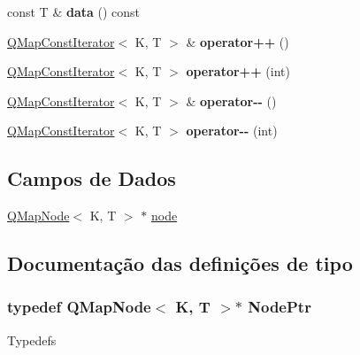 \begin{DoxyCompactItemize}
\item 
\hypertarget{class_q_map_const_iterator_ad6b649d981086e75f241ff939f275e14}{const T \& {\bfseries data} () const }\label{class_q_map_const_iterator_ad6b649d981086e75f241ff939f275e14}

\item 
\hypertarget{class_q_map_const_iterator_a0afe02281082a9eb4057b65d4f2b102f}{\hyperlink{class_q_map_const_iterator}{Q\-Map\-Const\-Iterator}$<$ K, T $>$ \& {\bfseries operator++} ()}\label{class_q_map_const_iterator_a0afe02281082a9eb4057b65d4f2b102f}

\item 
\hypertarget{class_q_map_const_iterator_a8886dab4e16318247a0074c3c15d358c}{\hyperlink{class_q_map_const_iterator}{Q\-Map\-Const\-Iterator}$<$ K, T $>$ {\bfseries operator++} (int)}\label{class_q_map_const_iterator_a8886dab4e16318247a0074c3c15d358c}

\item 
\hypertarget{class_q_map_const_iterator_a330c9aca9657c7035411e13bfe7548cf}{\hyperlink{class_q_map_const_iterator}{Q\-Map\-Const\-Iterator}$<$ K, T $>$ \& {\bfseries operator-\/-\/} ()}\label{class_q_map_const_iterator_a330c9aca9657c7035411e13bfe7548cf}

\item 
\hypertarget{class_q_map_const_iterator_a2f3a7332801402c4e27725f48067ad6c}{\hyperlink{class_q_map_const_iterator}{Q\-Map\-Const\-Iterator}$<$ K, T $>$ {\bfseries operator-\/-\/} (int)}\label{class_q_map_const_iterator_a2f3a7332801402c4e27725f48067ad6c}

\end{DoxyCompactItemize}
\subsection*{Campos de Dados}
\begin{DoxyCompactItemize}
\item 
\hyperlink{struct_q_map_node}{Q\-Map\-Node}$<$ K, T $>$ $\ast$ \hyperlink{class_q_map_const_iterator_a0d092ec36e1f2df9021f48435414fe69}{node}
\end{DoxyCompactItemize}


\subsection{Documentação das definições de tipo}
\hypertarget{class_q_map_const_iterator_af69493335fdffece95c987f0054ab47e}{
\subsubsection[{Node\-Ptr}]{\setlength{\rightskip}{0pt plus 5cm}typedef {\bf Q\-Map\-Node}$<$ K, T $>$$\ast$ {\bf Node\-Ptr}}}\label{class_q_map_const_iterator_af69493335fdffece95c987f0054ab47e}
Typedefs 

